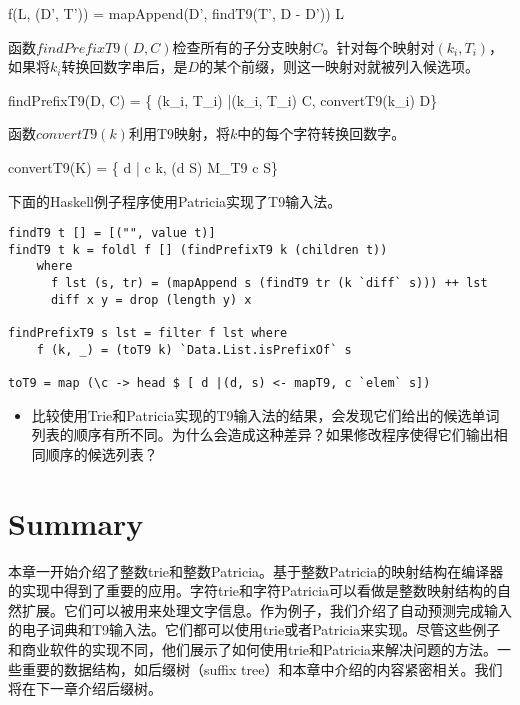 \documentclass[UTF8]{article}
\begin{document}
\be
f(L, (D', T')) = mapAppend(D', findT9(T', D - D')) \cup L
\ee

函数$findPrefixT9(D, C)$检查所有的子分支映射$C$。针对每个映射对$(k_i, T_i)$，如果将$k_i$转换回数字串后，是$D$的某个前缀，则这一映射对就被列入候选项。

\be
findPrefixT9(D, C) = \{ (k_i, T_i) |(k_i, T_i) \in C, convertT9(k_i) \sqsubset D\}
\ee

函数$convertT9(k)$利用T9映射，将$k$中的每个字符转换回数字。

\be
convertT9(K) = \{ d | \forall c \in k, \exists (d \rightarrow S) \in M_{T9} \Rightarrow c \in S\}
\ee

下面的Haskell例子程序使用Patricia实现了T9输入法。

\begin{lstlisting}
findT9 t [] = [("", value t)]
findT9 t k = foldl f [] (findPrefixT9 k (children t))
    where
      f lst (s, tr) = (mapAppend s (findT9 tr (k `diff` s))) ++ lst
      diff x y = drop (length y) x

findPrefixT9 s lst = filter f lst where
    f (k, _) = (toT9 k) `Data.List.isPrefixOf` s

toT9 = map (\c -> head $ [ d |(d, s) <- mapT9, c `elem` s])
\end{lstlisting}

\begin{Exercise}
\begin{itemize}
\item 比较使用Trie和Patricia实现的T9输入法的结果，会发现它们给出的候选单词列表的顺序有所不同。为什么会造成这种差异？如果修改程序使得它们输出相同顺序的候选列表？
\end{itemize}
\end{Exercise}

\section{Summary}

本章一开始介绍了整数trie和整数Patricia。基于整数Patricia的映射结构在编译器的实现中得到了重要的应用。字符trie和字符Patricia可以看做是整数映射结构的自然扩展。它们可以被用来处理文字信息。作为例子，我们介绍了自动预测完成输入的电子词典和T9输入法。它们都可以使用trie或者Patricia来实现。尽管这些例子和商业软件的实现不同，他们展示了如何使用trie和Patricia来解决问题的方法。一些重要的数据结构，如后缀树（suffix tree）和本章中介绍的内容紧密相关。我们将在下一章介绍后缀树。
\end{document}
